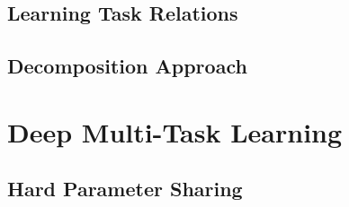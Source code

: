 


\subsection{Learning Task Relations}













\subsection{Decomposition Approach}




\section{Deep Multi-Task Learning}
\subsection{Hard Parameter Sharing}
